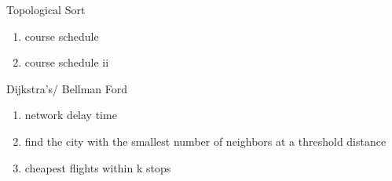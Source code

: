 \documentclass[24pt, a4]{article}
\begin{document}
Topological Sort
\begin{enumerate}
	\item course schedule
	\item course schedule ii
\end{enumerate}

Dijkstra's/ Bellman Ford
\begin{enumerate}
	\item network delay time
	\item find the city with the smallest number of neighbors at a threshold distance
	\item cheapest flights within k stops
\end{enumerate}
\end{document}
